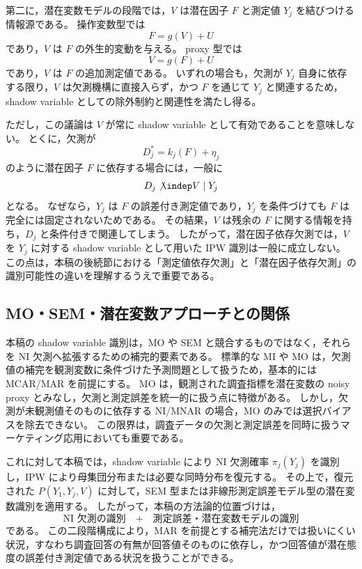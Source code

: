 第二に，潜在変数モデルの段階では，$V$ は潜在因子 $F$ と測定値 $Y_j$ を結びつける情報源である。
操作変数型では
\begin{equation}
  F=g(V)+U
  \label{eq:v-as-latent-iv-review}
\end{equation}
であり，$V$ は $F$ の外生的変動を与える。
proxy 型では
\begin{equation}
  V=g(F)+U
  \label{eq:v-as-proxy-review}
\end{equation}
であり，$V$ は $F$ の追加測定値である。
いずれの場合も，欠測が $Y_j$ 自身に依存する限り，$V$ は欠測機構に直接入らず，かつ $F$ を通じて $Y_j$ と関連するため，shadow variable としての除外制約と関連性を満たし得る。

ただし，この議論は $V$ が常に shadow variable として有効であることを意味しない。
とくに，欠測が
\begin{equation}
  D_j^*=k_j(F)+\eta_j
  \label{eq:f-dependent-missing-shadow-review}
\end{equation}
のように潜在因子 $F$ に依存する場合には，一般に
\begin{equation}
  D_j\not\indep V\mid Y_j
  \label{eq:shadow-f-missing-failure}
\end{equation}
となる。
なぜなら，$Y_j$ は $F$ の誤差付き測定値であり，$Y_j$ を条件づけても $F$ は完全には固定されないためである。
その結果，$V$ は残余の $F$ に関する情報を持ち，$D_j$ と条件付きで関連してしまう。
したがって，潜在因子依存欠測では，$V$ を $Y_j$ に対する shadow variable として用いた IPW 識別は一般に成立しない。
この点は，本稿の後続節における「測定値依存欠測」と「潜在因子依存欠測」の識別可能性の違いを理解するうえで重要である。

\subsection{MO・SEM・潜在変数アプローチとの関係}

本稿の shadow variable 識別は，MO や SEM と競合するものではなく，それらを NI 欠測へ拡張するための補完的要素である。
標準的な MI や MO は，欠測値の補完を観測変数に条件づけた予測問題として扱うため，基本的には MCAR/MAR を前提にする。
MO は，観測された調査指標を潜在変数の noisy proxy とみなし，欠測と測定誤差を統一的に扱う点に特徴がある。
しかし，欠測が未観測値そのものに依存する NI/MNAR の場合，MO のみでは選択バイアスを除去できない。
この限界は，調査データの欠測と測定誤差を同時に扱うマーケティング応用においても重要である。

これに対して本稿では，shadow variable により NI 欠測確率 $\pi_j(Y_j)$ を識別し，IPW により母集団分布または必要な同時分布を復元する。
その上で，復元された $P(Y_1,Y_j,V)$ に対して，SEM 型または非線形測定誤差モデル型の潜在変数識別を適用する。
したがって，本稿の方法論的位置づけは，
\begin{equation}
  \text{NI 欠測の識別}
  \quad+\quad
  \text{測定誤差・潜在変数モデルの識別}
  \label{eq:shadow-plus-latent}
\end{equation}
である。
この二段階構成により，MAR を前提とする補完法だけでは扱いにくい状況，すなわち調査回答の有無が回答値そのものに依存し，かつ回答値が潜在態度の誤差付き測定値である状況を扱うことができる。
